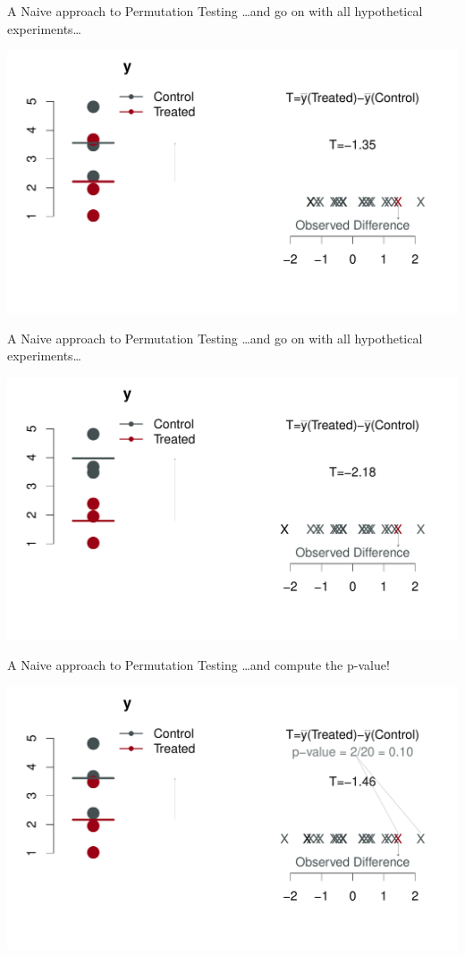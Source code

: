 \begin{frame}{A Naive approach to Permutation Testing}
 \ldots and go on with all hypothetical experiments\ldots 
\begin{center}
\includegraphics[width=1.1\textwidth]{figures/permsslides18} 
\end{center}
\end{frame}


\begin{frame}{A Naive approach to Permutation Testing}
 \ldots and go on with all hypothetical experiments\ldots 
\begin{center}
\includegraphics[width=1.1\textwidth]{figures/permsslides19} 
\end{center}
\end{frame}

\begin{frame}{A Naive approach to Permutation Testing}
 \ldots and compute the p-value!
\begin{center}
\includegraphics[width=1.1\textwidth]{figures/permsslides20} 
\end{center}
\end{frame}